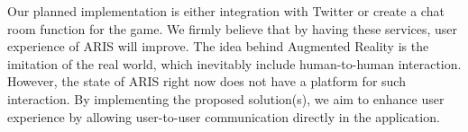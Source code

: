 \documentclass{sigchi}
\begin{document}
Our planned implementation is either integration with Twitter or create a chat room function for the game. We firmly believe that by having these services, user experience of ARIS will improve. The idea behind Augmented Reality is the imitation of the real world, which inevitably include human-to-human interaction. However, the state of ARIS right now does not have a platform for  such interaction. By implementing the proposed solution(s), we aim to enhance user experience by allowing user-to-user communication directly in the application.

%
%
%
%
%


\end{document}

